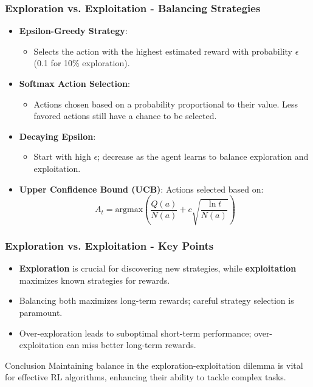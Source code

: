 \documentclass[aspectratio=169]{beamer}
\begin{document}
\begin{frame}[fragile]
    \frametitle{Exploration vs. Exploitation - Balancing Strategies}
    \begin{itemize}
        \item \textbf{Epsilon-Greedy Strategy}:
        \begin{itemize}
            \item Selects the action with the highest estimated reward with probability \(\epsilon\) (0.1 for 10\% exploration).
        \end{itemize}
        
        \item \textbf{Softmax Action Selection}:
        \begin{itemize}
            \item Actions chosen based on a probability proportional to their value. Less favored actions still have a chance to be selected.
        \end{itemize}

        \item \textbf{Decaying Epsilon}:
        \begin{itemize}
            \item Start with high \(\epsilon\); decrease as the agent learns to balance exploration and exploitation.
        \end{itemize}

        \item \textbf{Upper Confidence Bound (UCB)}:
        Actions selected based on:
        \begin{equation}
            A_t = \text{argmax} \left( \frac{Q(a)}{N(a)} + c \sqrt{\frac{\ln t}{N(a)}} \right)
        \end{equation}
    \end{itemize}
\end{frame}

\begin{frame}[fragile]
    \frametitle{Exploration vs. Exploitation - Key Points}
    \begin{itemize}
        \item \textbf{Exploration} is crucial for discovering new strategies, while \textbf{exploitation} maximizes known strategies for rewards.
        \item Balancing both maximizes long-term rewards; careful strategy selection is paramount.
        \item Over-exploration leads to suboptimal short-term performance; over-exploitation can miss better long-term rewards.
    \end{itemize}
    
    \begin{block}{Conclusion}
        Maintaining balance in the exploration-exploitation dilemma is vital for effective RL algorithms, enhancing their ability to tackle complex tasks.
    \end{block}
\end{frame}
\end{document}
